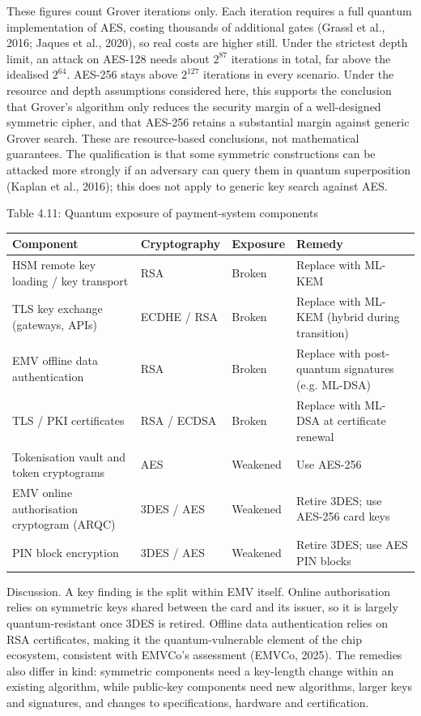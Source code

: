 \documentclass[12pt,oneside]{report}
\begin{document}
These figures count Grover iterations only. Each iteration requires a full quantum implementation of AES, costing thousands of additional gates (Grassl et al., 2016; Jaques et al., 2020), so real costs are higher still. Under the strictest depth limit, an attack on AES-128 needs about $2^{87}$ iterations in total, far above the idealised $2^{64}$. AES-256 stays above $2^{127}$ iterations in every scenario. Under the resource and depth assumptions considered here, this supports the conclusion that Grover's algorithm only reduces the security margin of a well-designed symmetric cipher, and that AES-256 retains a substantial margin against generic Grover search. These are resource-based conclusions, not mathematical guarantees. The qualification is that some symmetric constructions can be attacked more strongly if an adversary can query them in quantum superposition (Kaplan et al., 2016); this does not apply to generic key search against AES.
\par

\label{tab:4.11}Table 4.11: Quantum exposure of payment-system components
\par

\begin{center}\small\begin{tabularx}{\textwidth}{|W|W|W|W|}\hline
Component & Cryptography & Exposure & Remedy \\\hline
HSM remote key loading / key transport & RSA & Broken & Replace with ML-KEM \\\hline
TLS key exchange (gateways, APIs) & ECDHE / RSA & Broken & Replace with ML-KEM (hybrid during transition) \\\hline
EMV offline data authentication & RSA & Broken & Replace with post-quantum signatures (e.g. ML-DSA) \\\hline
TLS / PKI certificates & RSA / ECDSA & Broken & Replace with ML-DSA at certificate renewal \\\hline
Tokenisation vault and token cryptograms & AES & Weakened & Use AES-256 \\\hline
EMV online authorisation cryptogram (ARQC) & 3DES / AES & Weakened & Retire 3DES; use AES-256 card keys \\\hline
PIN block encryption & 3DES / AES & Weakened & Retire 3DES; use AES PIN blocks \\\hline\end{tabularx}\end{center}

Discussion. A key finding is the split within EMV itself. Online authorisation relies on symmetric keys shared between the card and its issuer, so it is largely quantum-resistant once 3DES is retired. Offline data authentication relies on RSA certificates, making it the quantum-vulnerable element of the chip ecosystem, consistent with EMVCo's assessment (EMVCo, 2025). The remedies also differ in kind: symmetric components need a key-length change within an existing algorithm, while public-key components need new algorithms, larger keys and signatures, and changes to specifications, hardware and certification.
\par
\end{document}
